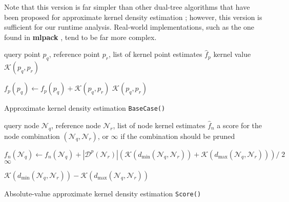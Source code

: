 Note that this version is far simpler than other dual-tree algorithms that have
been proposed for approximate kernel density estimation \citep[see, for
instance,][]{gray2003nonparametric}; however, this version is sufficient for our
runtime analysis.  Real-world implementations, such as the one found in
\textbf{mlpack} \citep{mlpack2013}, tend to be far more complex.

\begin{algorithm}[tb]
  \begin{algorithmic}[1]
     query point $p_q$, reference point $p_r$, list of
  kernel point estimates $\hat{f}_p$
     kernel value $\mathcal{K}(p_q, p_r)$

    \medskip
    \STATE $f_p(p_q) \gets f_p(p_q) + \mathcal{K}(p_q, p_r)$
\label{alg:kde-bc-update}
    \RETURN $\mathcal{K}(p_q, p_r)$
  \end{algorithmic}

  \caption{Approximate kernel density estimation \texttt{BaseCase()}}
  \label{alg:kde_base_case}
\end{algorithm}

\begin{algorithm}[tb]
  \begin{algorithmic}[1]
     query node $\mathscr{N}_q$, reference node
$\mathscr{N}_r$, list of node kernel estimates $\hat{f}_n$
     a score for the node combination $(\mathscr{N}_q,
\mathscr{N}_r)$, or $\infty$ if the combination should be pruned

    \medskip

\label{alg:ava-kde-prune}
      \STATE $f_n(\mathscr{N}_q) \gets f_n(\mathscr{N}_q) + |
\mathscr{D}^p(\mathscr{N}_r) | \left(\mathcal{K}(d_{\min}(\mathscr{N}_q,
\mathscr{N}_r)) + \mathcal{K}(d_{\max}(\mathscr{N}_q, \mathscr{N}_r))\right)
/\;2$ \label{alg:ava-kde-update}
      \RETURN $\infty$
    \ENDIF

    \RETURN $\mathcal{K}(d_{\min}(\mathscr{N}_q, \mathscr{N}_r)) -
\mathcal{K}(d_{\max}(\mathscr{N}_q, \mathscr{N}_r))$
  \end{algorithmic}

  \caption{Absolute-value approximate kernel density estimation
\texttt{Score()}}
  \label{alg:kde_score}
\end{algorithm}

